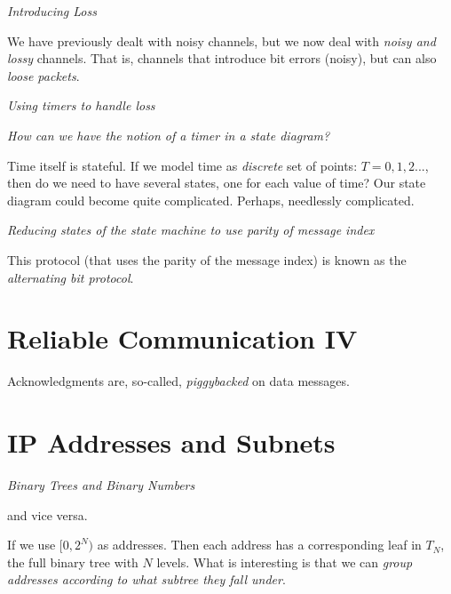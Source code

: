 \textit{Introducing Loss}

We have previously dealt with noisy channels, 
but we now deal with \textit{noisy and lossy} channels. 
That is, channels that introduce bit errors (noisy), but can 
also \textit{loose packets}.


\frmrule 

\textit{Using timers to handle loss}



\frmrule 

\textit{How can we have the notion of a timer in a state diagram?}

Time itself is stateful. If we model time as \textit{discrete} set of points: 
$T= 0,1,2...$, then do we need to have several states, one for each value of time?
Our state diagram could become quite complicated. Perhaps, needlessly complicated.


\frmrule


\frmrule 

\textit{Reducing states of the state machine to use parity of message index}


This protocol (that uses the parity of the message index) 
is known as the \textit{alternating bit protocol}.


\section{Reliable Communication IV}


Acknowledgments are, so-called, \textit{piggybacked} on data messages.



\section{IP Addresses and Subnets}



\frmrule 

\textit{Binary Trees and Binary Numbers}


\highlightdef{The leaves of a binary tree with $N$ levels correspond to $[0,2^{N})$}
and vice versa. 

If we use $[0,2^{N})$ as addresses. Then each address has a corresponding 
leaf in $T_N$, the full binary tree with $N$ levels. What is interesting is 
that we can \textit{group addresses according to what subtree they fall under}. 


